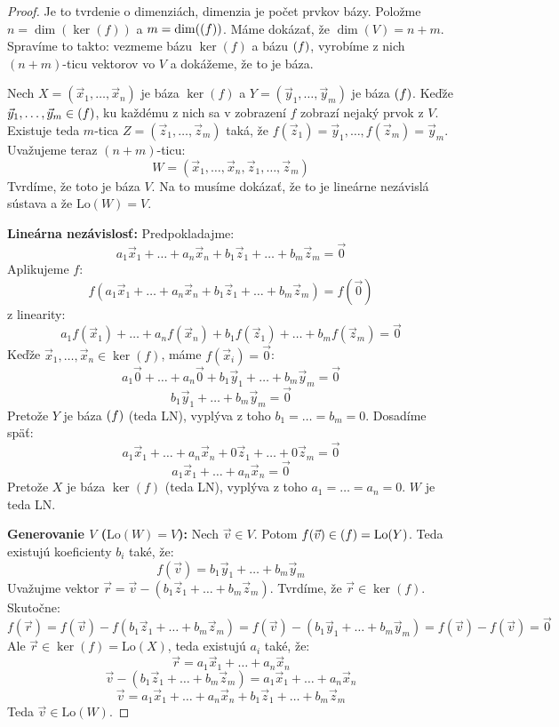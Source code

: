 \documentclass[11pt,a4paper]{article}
\theoremstyle{definition}
\theoremstyle{plain}
\theoremstyle{remark}
\newcommand{\Lo}{\mathrm{Lo}}
\let\Im\relax
\DeclareMathOperator{\Im}{Im}
\begin{document}
\begin{proof}
Je to tvrdenie o dimenziách, dimenzia je počet prvkov bázy. Položme $n = \dim(\ker(f))$ a $m = \dim(\Im(f))$. Máme dokázať, že $\dim(V) = n + m$. Spravíme to takto: vezmeme bázu $\ker(f)$ a bázu $\Im(f)$, vyrobíme z nich $(n+m)$-ticu vektorov vo $V$ a dokážeme, že to je báza.

Nech $X = (\vec{x}_1, \dots, \vec{x}_n)$ je báza $\ker(f)$ a $Y = (\vec{y}_1, \dots, \vec{y}_m)$ je báza $\Im(f)$. Keďže $\vec{y}_1, \dots, \vec{y}_m \in \Im(f)$, ku každému z nich sa v zobrazení $f$ zobrazí nejaký prvok z $V$. Existuje teda $m$-tica $Z = (\vec{z}_1, \dots, \vec{z}_m)$ taká, že $f(\vec{z}_1) = \vec{y}_1, \dots, f(\vec{z}_m) = \vec{y}_m$.
Uvažujeme teraz $(n+m)$-ticu:
\[ W = (\vec{x}_1, \dots, \vec{x}_n, \vec{z}_1, \dots, \vec{z}_m) \]
Tvrdíme, že toto je báza $V$. Na to musíme dokázať, že to je lineárne nezávislá sústava a že $\Lo(W) = V$.

\textbf{Lineárna nezávislosť:} Predpokladajme:
\[ a_1\vec{x}_1 + \dots + a_n\vec{x}_n + b_1\vec{z}_1 + \dots + b_m\vec{z}_m = \vec{0} \]
Aplikujeme $f$:
\[ f(a_1\vec{x}_1 + \dots + a_n\vec{x}_n + b_1\vec{z}_1 + \dots + b_m\vec{z}_m) = f(\vec{0}) \]
z linearity:
\[ a_1f(\vec{x}_1) + \dots + a_nf(\vec{x}_n) + b_1f(\vec{z}_1) + \dots + b_mf(\vec{z}_m) = \vec{0} \]
Keďže $\vec{x}_1, \dots, \vec{x}_n \in \ker(f)$, máme $f(\vec{x}_i) = \vec{0}$:
\[ a_1\vec{0} + \dots + a_n\vec{0} + b_1\vec{y}_1 + \dots + b_m\vec{y}_m = \vec{0} \]
\[ b_1\vec{y}_1 + \dots + b_m\vec{y}_m = \vec{0} \]
Pretože $Y$ je báza $\Im(f)$ (teda LN), vyplýva z toho $b_1 = \dots = b_m = 0$. Dosadíme späť:
\[ a_1\vec{x}_1 + \dots + a_n\vec{x}_n + 0\vec{z}_1 + \dots + 0\vec{z}_m = \vec{0} \]
\[ a_1\vec{x}_1 + \dots + a_n\vec{x}_n = \vec{0} \]
Pretože $X$ je báza $\ker(f)$ (teda LN), vyplýva z toho $a_1 = \dots = a_n = 0$. $W$ je teda LN.

\textbf{Generovanie $V$ ($\Lo(W) = V$):} Nech $\vec{v} \in V$. Potom $f(\vec{v}) \in \Im(f) = \Lo(Y)$. Teda existujú koeficienty $b_i$ také, že:
\[ f(\vec{v}) = b_1\vec{y}_1 + \dots + b_m\vec{y}_m \]
Uvažujme vektor $\vec{r} = \vec{v} - (b_1\vec{z}_1 + \dots + b_m\vec{z}_m)$. Tvrdíme, že $\vec{r} \in \ker(f)$. Skutočne:
\[ f(\vec{r}) = f(\vec{v}) - f(b_1\vec{z}_1 + \dots + b_m\vec{z}_m) = f(\vec{v}) - (b_1\vec{y}_1 + \dots + b_m\vec{y}_m) = f(\vec{v}) - f(\vec{v}) = \vec{0} \]
Ale $\vec{r} \in \ker(f) = \Lo(X)$, teda existujú $a_i$ také, že:
\[ \vec{r} = a_1\vec{x}_1 + \dots + a_n\vec{x}_n \]
\[ \vec{v} - (b_1\vec{z}_1 + \dots + b_m\vec{z}_m) = a_1\vec{x}_1 + \dots + a_n\vec{x}_n \]
\[ \vec{v} = a_1\vec{x}_1 + \dots + a_n\vec{x}_n + b_1\vec{z}_1 + \dots + b_m\vec{z}_m \]
Teda $\vec{v} \in \Lo(W)$.
\end{proof}
\end{document}
